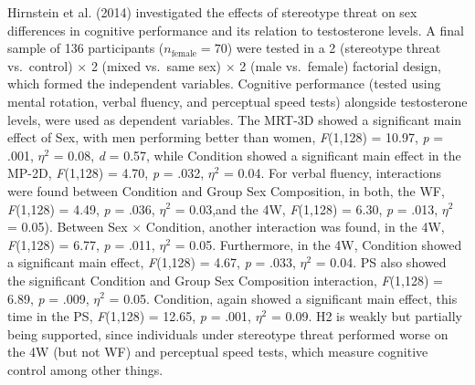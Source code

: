 \documentclass[
  stu, a4paper,floatsintext]{apa7}
\begin{document}
Hirnstein et al. (2014) investigated the effects of stereotype threat on sex differences in cognitive performance and its relation to testosterone levels.
A final sample of 136 participants (\(n_{\text{female}} = 70\)) were tested in a 2 (stereotype threat vs.~control) \(\times\) 2 (mixed vs.~same sex) \(\times\) 2 (male vs.~female) factorial design, which formed the independent variables.
Cognitive performance (tested using mental rotation, verbal fluency, and perceptual speed tests) alongside testosterone levels, were used as dependent variables.
The MRT-3D showed a significant main effect of Sex, with men performing better than women, \emph{F}(1,128) = 10.97, \emph{p} = .001, \(\eta^{2}\) = 0.08, \emph{d} = 0.57, while Condition showed a significant main effect in the MP-2D, \emph{F}(1,128) = 4.70, \emph{p} = .032, \(\eta^{2}\) = 0.04.
For verbal fluency, interactions were found between Condition and Group Sex Composition, in both, the WF, \emph{F}(1,128) = 4.49, \emph{p} = .036, \(\eta^{2}\) = 0.03,and the 4W, \emph{F}(1,128) = 6.30, \emph{p} = .013, \(\eta^{2}\) = 0.05).
Between Sex \(\times\) Condition, another interaction was found, in the 4W, \emph{F}(1,128) = 6.77, \emph{p} = .011, \(\eta^{2}\) = 0.05.
Furthermore, in the 4W, Condition showed a significant main effect, \emph{F}(1,128) = 4.67, \emph{p} = .033, \(\eta^{2}\) = 0.04.
PS also showed the significant Condition and Group Sex Composition interaction, \emph{F}(1,128) = 6.89, \emph{p} = .009, \(\eta^{2}\) = 0.05.
Condition, again showed a significant main effect, this time in the PS, \emph{F}(1,128) = 12.65, \emph{p} = .001, \(\eta^{2}\) = 0.09.
H2 is weakly but partially being supported, since individuals under stereotype threat performed worse on the 4W (but not WF) and perceptual speed tests, which measure cognitive control among other things.
\end{document}
